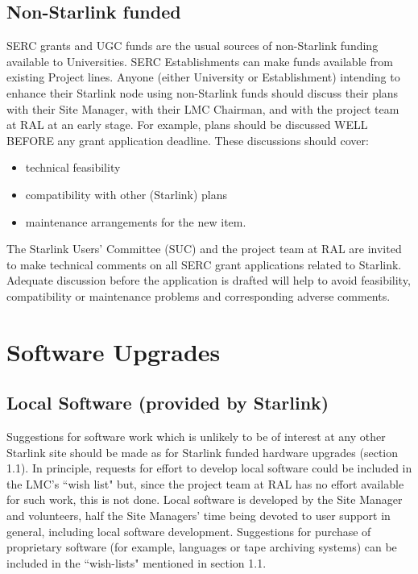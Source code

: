 \subsection{Non-Starlink funded}
SERC grants and UGC funds are the usual sources of non-Starlink funding
available to Universities.
SERC Establishments can make funds available from existing Project lines.
Anyone (either University or Establishment) intending to enhance their Starlink
node using non-Starlink funds should discuss their plans with their Site
Manager, with their LMC Chairman, and with the project team at RAL at an early
stage.
For example, plans should be discussed WELL BEFORE any grant application
deadline.
These discussions should cover:
\begin{itemize}
\item technical feasibility
\item compatibility with other (Starlink) plans
\item maintenance arrangements for the new item.
\end{itemize}
The Starlink Users' Committee (SUC) and the project team at RAL are invited to
make technical comments on all SERC grant applications related to Starlink.
Adequate discussion before the application is drafted will help to avoid
feasibility, compatibility or maintenance problems and corresponding adverse
comments.

\section {Software Upgrades}

\subsection{Local Software (provided by Starlink)}
Suggestions for software work which is unlikely to be of interest at any other
Starlink site should be made as for Starlink funded hardware upgrades (section
1.1).
In principle, requests for effort to develop local software could be included in
the LMC's ``wish list" but, since the project team at RAL has no effort
available for such work, this is not done.
Local software is developed by the Site Manager and volunteers, half the Site
Managers' time being devoted to user support in general, including local
software development.
Suggestions for purchase of proprietary software (for example, languages
or tape archiving systems) can be included in the ``wish-lists" mentioned in
section 1.1.

